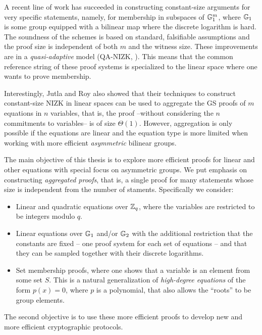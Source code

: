 A recent line of work 
  \cite{AC:JutRoy13,C:JutRoy14,EC:KilWee15,EC:LPJY14} 
has succeeded in constructing constant-size  
  arguments for very specific statements, namely, for membership in subspaces of $\mathbb{G}_1^{m}$, 
  where $\mathbb{G}_1$ is some group equipped with a bilinear map where the discrete logarithm is hard. 
The soundness of the schemes is based on standard, falsifiable assumptions 
  and the proof size is independent of both $m$ and the witness size.  These improvements are in a  \textit{quasi-adaptive} 
  model (QA-NIZK, \cite{AC:JutRoy13}).  This means that the common reference string of these proof systems is 
  specialized to the linear space where one wants to prove membership.
  
Interestingly, Jutla and Roy  \cite{C:JutRoy14} also showed that their techniques to construct 
  constant-size NIZK in linear spaces can be used to aggregate the GS proofs of $m$ equations in $n$ variables, that is, the proof --without considering the $n$ commitments to variables-- is of size $\Theta(1)$. However, aggregation is only possible if the equations are linear and the equation type is more limited when working with more efficient \emph{asymmetric} bilinear groups. 

The main objective of this thesis is to explore more efficient proofs for linear and other equations with special focus on asymmetric groups.
We put emphasis on constructing \emph{aggregated proofs}, that is, a single proof for many statements whose size is independent from the number of staments.
Specifically we consider:
\begin{itemize}
\item Linear and quadratic equations over $\mathbb{Z}_q$, where the variables are restricted to be integers modulo $q$.
\item Linear equations over $\mathbb{G}_1$ and/or $\mathbb{G}_2$ with the additional restriction that the constants are fixed -- one proof system for each set of equations -- and that they 
can be sampled together with their discrete logarithms.
\item Set membership proofs, where one shows that a variable is an element from some set $S$. This is a natural generalization of \emph{high-degree equations} of the form $p(x)=0$, where $p$ is a polynomial, that also allows the ``roots'' to be group elements.
\end{itemize}
The second objective is to use these more efficient proofs to develop new and more efficient cryptographic protocols.
